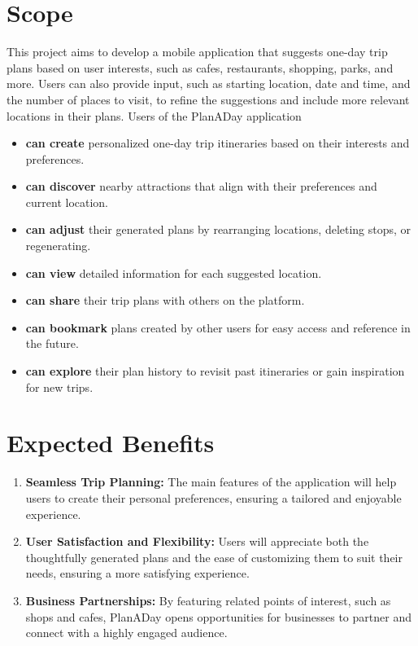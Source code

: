 \section{Scope}
This project aims to develop a mobile application that suggests one-day trip plans based on user
interests, such as cafes, restaurants, shopping, parks, and more. Users can also provide input,
such as starting location, date and time, and the number of places to visit, to refine the
suggestions and include more relevant locations in their plans. Users of the PlanADay
application
\begin{itemize}
    \item \textbf{can create} personalized one-day trip itineraries based on their interests and preferences.
    \item \textbf{can discover} nearby attractions that align with their preferences and current location.
    \item \textbf{can adjust} their generated plans by rearranging locations, deleting stops, or regenerating.
    \item \textbf{can view} detailed information for each suggested location.
    \item \textbf{can share} their trip plans with others on the platform.
    \item \textbf{can bookmark} plans created by other users for easy access and reference in the future.
    \item \textbf{can explore} their plan history to revisit past itineraries or gain inspiration for new trips.
\end{itemize}
\newpage

\section{Expected Benefits}
\begin{enumerate}
    \item \textbf{Seamless Trip Planning:} The main features of the application will help users to create
    their personal preferences, ensuring a tailored and enjoyable experience.
    \item \textbf{User Satisfaction and Flexibility:} Users will appreciate both the thoughtfully generated
    plans and the ease of customizing them to suit their needs, ensuring a more satisfying
    experience.
    \item \textbf{Business Partnerships:} By featuring related points of interest, such as shops and cafes,
    PlanADay opens opportunities for businesses to partner and connect with a highly
    engaged audience.
\end{enumerate}
